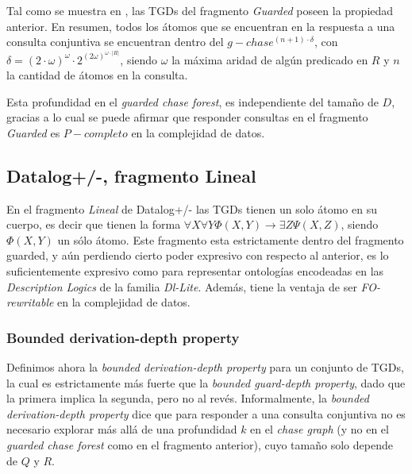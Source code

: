 \documentclass[11pt,a4paper,twoside]{tesis}
\begin{document}
Tal como se muestra en \cite{JWS}, las TGDs del fragmento \textit{Guarded} poseen la propiedad anterior. En resumen, todos los átomos que se encuentran en la respuesta a una consulta conjuntiva se encuentran dentro del $g-chase^{(n + 1)\cdot\delta}$, con $\delta = (2\cdot\omega)^\omega\cdot2^{(2\omega)^{\omega\cdot|R|}}$, siendo $\omega$ la máxima aridad de algún predicado en $R$ y $n$ la cantidad de átomos en la consulta.

Esta profundidad en el \textit{guarded chase forest}, es independiente del tamaño de $D$, gracias a lo cual se puede afirmar que responder consultas en el fragmento \textit{Guarded} es $P-completo$ en la complejidad de datos.

\subsection{Datalog+/-, fragmento Lineal}

En el fragmento \textit{Lineal} de Datalog+/- las TGDs tienen un solo átomo en su cuerpo, es decir que tienen la forma $\forall X \forall  Y \Phi(X, Y) \rightarrow \exists Z \Psi(X,Z)$, siendo $\Phi(X,Y)$ un sólo átomo. Este fragmento esta estrictamente dentro del fragmento guarded, y aún perdiendo cierto poder expresivo con respecto al anterior, es lo suficientemente expresivo como para representar ontologías encodeadas en las \textit{Description Logics} de la familia \textit{Dl-Lite}. Además, tiene la ventaja de ser \textit{FO-rewritable} en la complejidad de datos.

\subsubsection{Bounded derivation-depth property}

Definimos ahora la \textit{bounded derivation-depth property} para un conjunto de TGDs, la cual es estrictamente más fuerte que la \textit{ bounded guard-depth property}, dado que la primera implica la segunda, pero no al revés. Informalmente, la \textit{bounded derivation-depth property} dice que para responder a una consulta conjuntiva no es necesario explorar más allá de una profundidad $k$ en el \textit{chase graph} (y no en el \textit{guarded chase forest} como en el fragmento anterior), cuyo tamaño solo depende de $Q$ y $R$.
\end{document}
